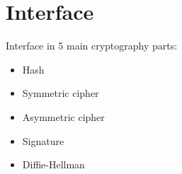 \section{Interface}

\begin{frame}

Interface in 5 main cryptography parts:
\begin{itemize}
  \item Hash
  \item Symmetric cipher
  \item Asymmetric cipher
  \item Signature
  \item Diffie-Hellman
\end{itemize}

\end{frame}